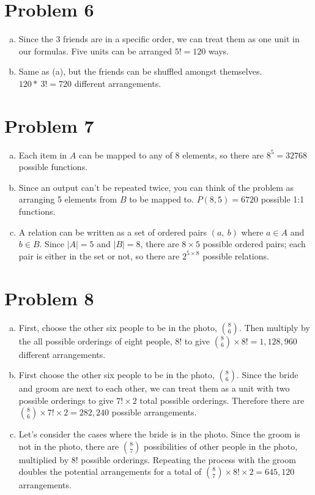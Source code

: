 \documentclass[11pt]{article}
\begin{document}
\section*{Problem 6}
\begin{enumerate}[(a)]
	\item
	Since the 3 friends are in a specific order, we can treat them as one unit in our formulas. Five units can be arranged $5! = 120 $ ways.
	\item
	Same as (a), but the friends can be shuffled amongst themselves. $120 *\ 3! = 720$ different arrangements.
\end{enumerate}


\section*{Problem 7}
\begin{enumerate}[(a)]
	\item
	Each item in $A$ can be mapped to any of 8 elements, so there are $8^5 = 32768$ possible functions.
	
	\item
	Since an output can't be repeated twice, you can think of the problem as arranging 5 elements from $B$ to be mapped to. $P(8, 5) = 6720$ 
	possible 1:1 functions.
	
	\item
	A relation can be written as a set of ordered pairs $(a,\ b)$ where $a \in A$ and $b \in B$. Since $|A| = 5$ and $|B| = 8$, there are $8 \times 
	5$ possible ordered pairs; each pair is either in the set or not, so there are $2^{5 \times 8}$ possible relations.

\end{enumerate}
	
\section*{Problem 8}
\begin{enumerate}[(a)]
	\item
	First, choose the other six people to be in the photo, $8 \choose 6$. Then multiply by the all possible orderings of eight people, $8!$ to 
	give ${8 \choose 6} \times 8! = 1,128,960$ different arrangements.

	\item
	First choose the other six people to be in the photo, $8 \choose 6$. Since the bride and groom are next to each other, we can treat them as a 
	unit with two possible orderings to give $7! \times 2$ total possible orderings. Therefore there are ${8 \choose 6} \times 7! \times 2 = 
	282,240$ possible arrangements.

	\item
	Let's consider the cases where the bride is in the photo. Since the groom is not in the photo, there are $8 \choose 7$ possibilities of other 
	people in the photo, multiplied by $8!$ possible orderings. Repeating the process with the groom doubles the potential arrangements for a total 
	of ${8 \choose 7} \times 8! \times 2 = 645,120$ arrangements.
\end{enumerate}
\end{document}
